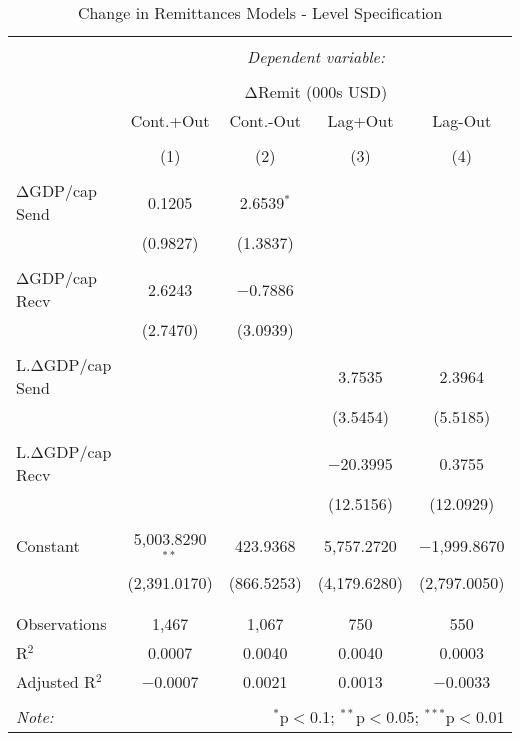 
\begin{table}[!htbp] \centering 
  \caption{Change in Remittances Models - Level Specification} 
  \label{} 
\begin{tabular}{@{\extracolsep{5pt}}lcccc} 
\\[-1.8ex]\hline 
\hline \\[-1.8ex] 
 & \multicolumn{4}{c}{\textit{Dependent variable:}} \\ 
\cline{2-5} 
\\[-1.8ex] & \multicolumn{4}{c}{ΔRemit (000s USD)} \\ 
 & Cont.+Out & Cont.-Out & Lag+Out & Lag-Out \\ 
\\[-1.8ex] & (1) & (2) & (3) & (4)\\ 
\hline \\[-1.8ex] 
 ΔGDP/cap Send & 0.1205 & 2.6539$^{*}$ &  &  \\ 
  & (0.9827) & (1.3837) &  &  \\ 
  & & & & \\ 
 ΔGDP/cap Recv & 2.6243 & $-$0.7886 &  &  \\ 
  & (2.7470) & (3.0939) &  &  \\ 
  & & & & \\ 
 L.ΔGDP/cap Send &  &  & 3.7535 & 2.3964 \\ 
  &  &  & (3.5454) & (5.5185) \\ 
  & & & & \\ 
 L.ΔGDP/cap Recv &  &  & $-$20.3995 & 0.3755 \\ 
  &  &  & (12.5156) & (12.0929) \\ 
  & & & & \\ 
 Constant & 5,003.8290$^{**}$ & 423.9368 & 5,757.2720 & $-$1,999.8670 \\ 
  & (2,391.0170) & (866.5253) & (4,179.6280) & (2,797.0050) \\ 
  & & & & \\ 
\hline \\[-1.8ex] 
Observations & 1,467 & 1,067 & 750 & 550 \\ 
R$^{2}$ & 0.0007 & 0.0040 & 0.0040 & 0.0003 \\ 
Adjusted R$^{2}$ & $-$0.0007 & 0.0021 & 0.0013 & $-$0.0033 \\ 
\hline 
\hline \\[-1.8ex] 
\textit{Note:}  & \multicolumn{4}{r}{$^{*}$p$<$0.1; $^{**}$p$<$0.05; $^{***}$p$<$0.01} \\ 
\end{tabular} 
\end{table} 
